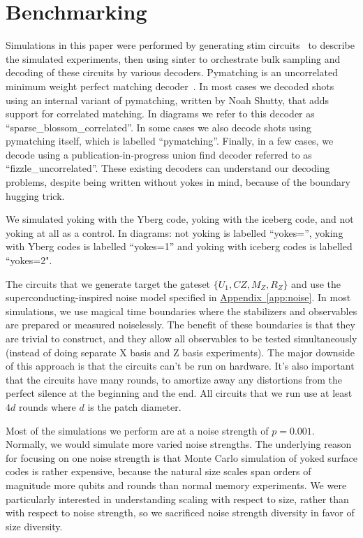 \documentclass[onecolumn,unpublished,a4paper]{quantumarticle}
\theoremstyle{definition}
\theoremstyle{definition}
\theoremstyle{definition}
\DeclareRobustCommand{\app}[1]{\hyperref[app:#1]{Appendix~\ref*{app:#1}}}
\begin{document}
\section{Benchmarking}
\label{sec:benchmarking}

Simulations in this paper were performed by generating stim circuits~\cite{gidney2021stim} to describe the simulated experiments, then using sinter to orchestrate bulk sampling and decoding of these circuits by various decoders.
Pymatching is an uncorrelated minimum weight perfect matching decoder~\cite{higgott2023sparseblossom}.
In most cases we decoded shots using an internal variant of pymatching, written by Noah Shutty, that adds support for correlated matching.
In diagrams we refer to this decoder as ``sparse\_blossom\_correlated''.
In some cases we also decode shots using pymatching itself, which is labelled ``pymatching''.
Finally, in a few cases, we decode using a publication-in-progress union find decoder referred to as ``fizzle\_uncorrelated''.
These existing decoders can understand our decoding problems, despite being written without yokes in mind, because of the boundary hugging trick.

We simulated yoking with the Yberg code, yoking with the iceberg code, and not yoking at all as a control.
In diagrams: not yoking is labelled ``yokes='', yoking with Yberg codes is labelled ``yokes=1'' and yoking with iceberg codes is labelled ``yokes=2".

The circuits that we generate target the gateset $\{U_1,CZ,M_Z,R_Z\}$ and use the superconducting-inspired noise model specified in \app{noise}.
In most simulations, we use magical time boundaries where the stabilizers and observables are prepared or measured noiselessly.
The benefit of these boundaries is that they are trivial to construct, and they allow all observables to be tested simultaneously (instead of doing separate X basis and Z basis experiments).
The major downside of this approach is that the circuits can't be run on hardware.
It's also important that the circuits have many rounds, to amortize away any distortions from the perfect silence at the beginning and the end.
All circuits that we run use at least $4d$ rounds where $d$ is the patch diameter.

Most of the simulations we perform are at a noise strength of $p=0.001$.
Normally, we would simulate more varied noise strengths.
The underlying reason for focusing on one noise strength is that Monte Carlo simulation of yoked surface codes is rather expensive, because the natural size scales span orders of magnitude more qubits and rounds than normal memory experiments.
We were particularly interested in understanding scaling with respect to size, rather than with respect to noise strength, so we sacrificed noise strength diversity in favor of size diversity.
\end{document}
